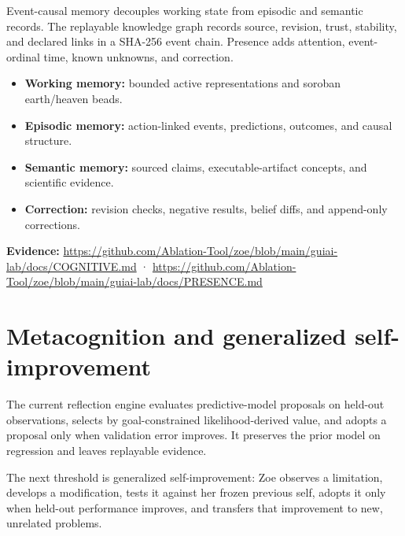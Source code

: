 \documentclass[11pt]{article}
\newcommand{\evidence}[1]{\par\smallskip\small\color{ZoeGray}\textbf{Evidence:} #1\normalsize\par\smallskip}
\begin{document}
Event-causal memory decouples working state from episodic and semantic records. The replayable knowledge graph records source, revision, trust, stability, and declared links in a SHA-256 event chain. Presence adds attention, event-ordinal time, known unknowns, and correction.

\begin{itemize}
\item \textbf{Working memory:} bounded active representations and soroban earth/heaven beads.
\item \textbf{Episodic memory:} action-linked events, predictions, outcomes, and causal structure.
\item \textbf{Semantic memory:} sourced claims, executable-artifact concepts, and scientific evidence.
\item \textbf{Correction:} revision checks, negative results, belief diffs, and append-only corrections.
\end{itemize}

\evidence{\url{https://github.com/Ablation-Tool/zoe/blob/main/guiai-lab/docs/COGNITIVE.md} · \url{https://github.com/Ablation-Tool/zoe/blob/main/guiai-lab/docs/PRESENCE.md}}

\clearpage
\section{Metacognition and generalized self-improvement}

The current reflection engine evaluates predictive-model proposals on held-out observations, selects by goal-constrained likelihood-derived value, and adopts a proposal only when validation error improves. It preserves the prior model on regression and leaves replayable evidence.

The next threshold is generalized self-improvement: Zoe observes a limitation, develops a modification, tests it against her frozen previous self, adopts it only when held-out performance improves, and transfers that improvement to new, unrelated problems.
\end{document}
